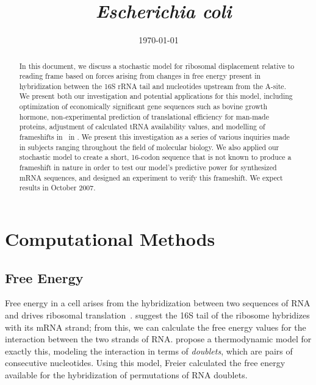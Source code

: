 \documentclass[12pt]{article}
\author{\sc{\BWFauthors}}
\date{{\sc \today}}
\title{\bf{\BWFtitle~\emph{Escherichia coli}}}
\numberwithin{equation}{section}
\begin{document}
\maketitle
\tableofcontents
\clearpage

\begin{abstract}\begin{normalsize}
  In this document, we discuss a stochastic model for ribosomal displacement relative to reading 
  frame based on forces arising from changes in free energy present in hybridization between the 
  16S rRNA tail and nucleotides upstream from the A-site.  We present both our investigation and 
  potential applications for this model, including optimization of economically significant gene
  sequences such as bovine growth hormone, non-experimental prediction of translational efficiency for man-made 
  proteins, adjustment of calculated tRNA availability values, and modelling of frameshifts in \prfB\ in \ecoli.
  We present this investigation as a series of various inquiries made 
  in subjects ranging throughout the field of molecular biology.  We also applied our stochastic 
  model to create a short, 16-codon sequence that is not known to produce a frameshift in nature 
  in order to test our model's predictive power for synthesized mRNA sequences, and designed an 
  experiment to verify this frameshift.  We expect results in October 2007.
\end{normalsize}\end{abstract}

\clearpage
{}

\section{Computational Methods}
\subsection{Free Energy}
\label{freeenergy}

Free energy in a cell arises from the hybridization between two
sequences of RNA and drives ribosomal translation~\cite{starmer}.
\citet{weiss88} suggest the 16S tail of the ribosome hybridizes with its mRNA strand;
from this, we can calculate the free energy values for the interaction between the two strands of RNA.
\citet{freier} propose a thermodynamic model for exactly this,
modeling the interaction in terms of \emph{doublets}, which are pairs of consecutive nucleotides.
Using this model, Freier calculated the free energy available
for the hybridization of permutations of RNA doublets.
\end{document}
